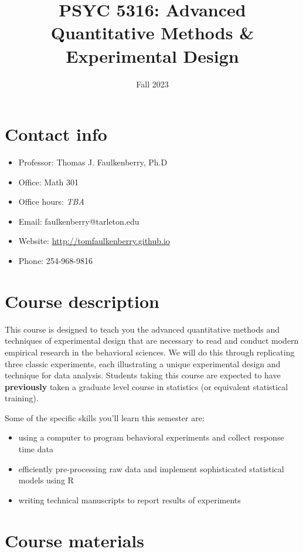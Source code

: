 \documentclass[10pt]{article}
\date{Fall 2023}
\title{PSYC 5316: Advanced Quantitative Methods \& Experimental Design}
\begin{document}
\maketitle

\section*{Contact info}
\label{sec:orga0a8406}
\begin{itemize}
\item Professor: Thomas J. Faulkenberry, Ph.D
\item Office: Math 301
\item Office hours: \emph{TBA}
\item Email: faulkenberry@tarleton.edu
\item Website: \url{http://tomfaulkenberry.github.io}
\item Phone: 254-968-9816
\end{itemize}

\section*{Course description}
\label{sec:org084024b}

This course is designed to teach you the advanced quantitative methods and techniques of experimental design that are necessary to read and conduct modern empirical research in the behavioral sciences. We will do this through replicating three classic experiments, each illustrating a unique experimental design and technique for data analysis.  Students taking this course are expected to have \textbf{previously} taken a graduate level course in statistics (or equivalent statistical training). 

Some of the specific skills you'll learn this semester are:
\begin{itemize}
\item using a computer to program behavioral experiments and collect response time data
\item efficiently pre-processing raw data and implement sophisticated statistical models using R
\item writing technical manuscripts to report results of experiments
\end{itemize}

\section*{Course materials}
\label{sec:orgb60920c}
\end{document}
